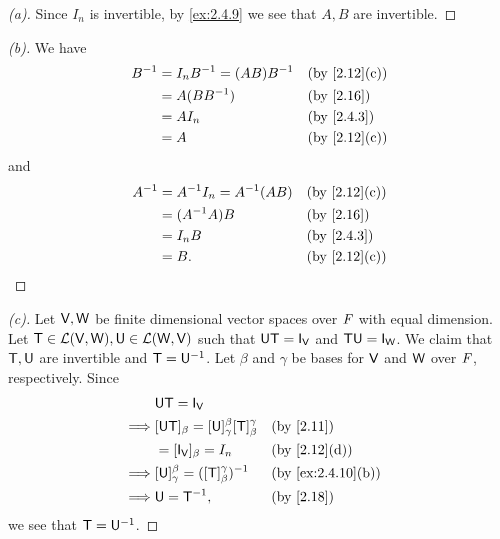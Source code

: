 \begin{proof}[(a)]
  Since \(I_n\) is invertible, by \cref{ex:2.4.9} we see that \(A, B\) are invertible.
\end{proof}

\begin{proof}[(b)]
  We have
  \begin{align*}
    B^{-1} & = I_n B^{-1} = (AB) B^{-1} &  & \text{(by \cref{2.12}(c))} \\
           & = A (B B^{-1})             &  & \text{(by \cref{2.16})}    \\
           & = A I_n                    &  & \text{(by \cref{2.4.3})}   \\
           & = A                        &  & \text{(by \cref{2.12}(c))}
  \end{align*}
  and
  \begin{align*}
    A^{-1} & = A^{-1} I_n = A^{-1} (AB) &  & \text{(by \cref{2.12}(c))} \\
           & = (A^{-1} A) B             &  & \text{(by \cref{2.16})}    \\
           & = I_n B                    &  & \text{(by \cref{2.4.3})}   \\
           & = B.                       &  & \text{(by \cref{2.12}(c))}
  \end{align*}
\end{proof}

\begin{proof}[(c)]
  Let \(\mathsf{V}, \mathsf{W}\) be finite dimensional vector spaces over \(\mathit{F}\) with equal dimension.
  Let \(\mathsf{T} \in \mathcal{L}(\mathsf{V}, \mathsf{W}), \mathsf{U} \in \mathcal{L}(\mathsf{W}, \mathsf{V})\) such that \(\U \T = \IT[\V]\) and \(\T \U = \IT[\W]\).
  We claim that \(\mathsf{T}, \mathsf{U}\) are invertible and \(\mathsf{T} = \mathsf{U}^{-1}\).
  Let \(\beta\) and \(\gamma\) be bases for \(\mathsf{V}\) and \(\mathsf{W}\) over \(\mathit{F}\), respectively.
  Since
  \begin{align*}
             & \U \T = \IT[\V]                                                                                    \\
    \implies & [\U \T]_{\beta} = [\U]_{\gamma}^{\beta} [\T]_{\beta}^{\gamma} &  & \text{(by \cref{2.11})}         \\
             & = [\IT[\V]]_{\beta} = I_n                                     &  & \text{(by \cref{2.12}(d))}      \\
    \implies & [\U]_{\gamma}^{\beta} = ([\T]_{\beta}^{\gamma})^{-1}          &  & \text{(by \cref{ex:2.4.10}(b))} \\
    \implies & \U = \T^{-1},                                                 &  & \text{(by \cref{2.18})}
  \end{align*}
  we see that \(\mathsf{T} = \mathsf{U}^{-1}\).
\end{proof}

